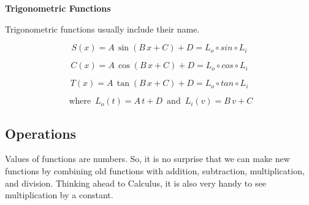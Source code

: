 \documentclass{ximera}
\begin{document}
\begin{template}  \textbf{\textcolor{blue!55!black}{Trigonometric Functions}} 


Trigonometric functions usually include their name.





\[ S(x) = A \, \sin(B \, x + C) + D = L_o \circ sin \circ L_i\]

\[ C(x) = A \, \cos(B \, x + C) + D = L_o \circ cos \circ L_i\]

\[ T(x) = A \, \tan(B \, x + C) + D = L_o \circ tan \circ L_i\]

\[
\text{ where } \,     L_o(t) = A \, t + D    \,  \text{ and } \,   L_i(v) = B \, v + C
\]







\end{template}






































\subsection*{Operations}





Values of functions are numbers.  So, it is no surprise that we can make new functions by combining old functions with addition, subtraction, multiplication, and division. Thinking ahead to Calculus, it is also very handy to see multiplication by a constant.
\end{document}
